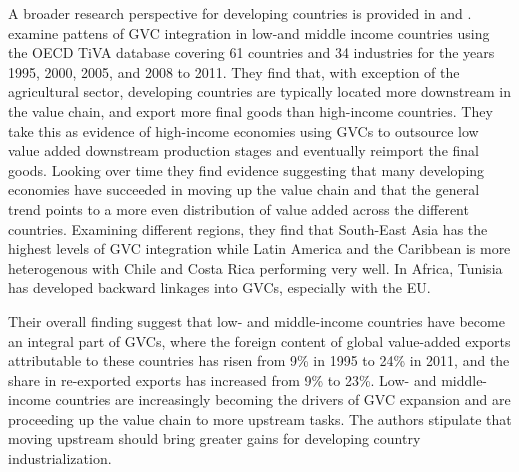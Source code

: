 \documentclass[a4paper]{article}
\begin{document}


A broader research perspective for developing countries is provided in \citet{Kummritz20162} and \citet{Kummritz20161}. \citet{Kummritz20162} examine pattens of GVC integration in low-and middle income countries using the OECD TiVA database covering 61 countries and 34 industries for the years 1995, 2000, 2005, and 2008 to 2011. They find that, with exception of the agricultural sector, developing countries are typically located more downstream in the value chain, and export more final goods than high-income countries. They take this as evidence of high-income economies using GVCs to outsource low value added downstream production stages and eventually reimport the final goods. Looking over time they find evidence suggesting that many developing economies have succeeded in moving up the value chain and that the general trend points to a more even distribution of value added across the different countries. Examining different regions, they find that South-East Asia has the highest levels of GVC integration while Latin America and the Caribbean is more heterogenous with Chile and Costa Rica performing very well. In Africa, Tunisia has developed backward linkages into GVCs, especially with the EU. \newline 

Their overall finding suggest that low- and middle-income countries have become an integral part of GVCs, where the foreign content of global value-added exports attributable to these countries has risen from 9\% in 1995 to 24\% in 2011, and the share in re-exported exports has increased from 9\% to 23\%. Low- and middle-income countries are increasingly becoming the drivers of GVC expansion and are proceeding up the value chain to more upstream tasks. The authors stipulate that moving upstream should bring greater gains for developing country industrialization. \newline
\end{document}

